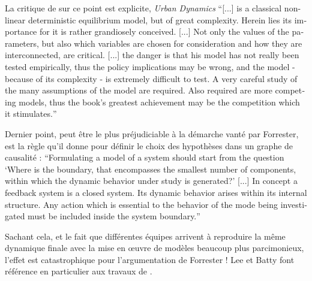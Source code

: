 La critique de \textcite{Tobler1970a} sur ce point est explicite, \textit{Urban Dynamics} \foreignquote{english}{[...] is a classical non-linear deterministic equilibrium model, but of great complexity. Herein lies its importance for it is rather grandiosely conceived. [...] Not only the values of the parameters, but also which variables are chosen for consideration and how they are interconnected, are critical. [...] the danger is that his model has not really been tested empirically, thus the policy implications may be wrong, and the model - because of its complexity - is extremely difficult to test. A very careful study of the many assumptions of the model are required. Also required are more competing models, thus the book’s greatest achievement may be the competition which it stimulates.}

Dernier point, peut être le plus préjudiciable à la démarche vanté par Forrester, est la règle qu'il donne pour définir le choix des hypothèses dans un graphe de causalité : \foreignquote{english}{Formulating a model of a system should start from the question \enquote{Where is the boundary, that encompasses the smallest number of components, within which the dynamic behavior under study is generated?} [...] In concept a feedback system is a closed system. Its dynamic behavior arises within its internal structure. Any action which is essential to the behavior of the mode being investigated must be included inside the system boundary.} \autocite{Forrester1968b, Richardson2011}



Sachant cela, et le fait que différentes équipes arrivent à reproduire la même dynamique finale avec la mise en œuvre de modèles beaucoup plus parcimonieux, l'effet est catastrophique pour l'argumentation de Forrester ! Lee  et Batty font référence en particulier aux travaux de \autocite{Stonebraker1972}.

